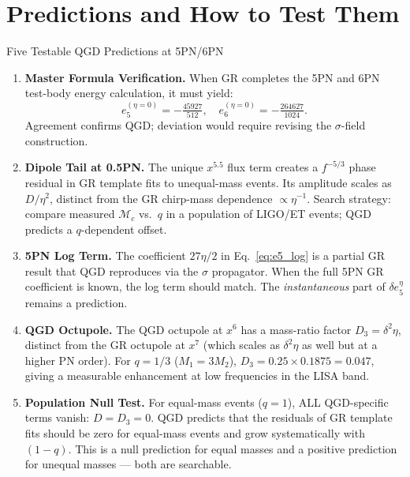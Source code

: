 \documentclass[11pt,a4paper]{article}
\theoremstyle{definition}
\theoremstyle{remark}
\begin{document}
	\section{Predictions and How to Test Them}
	\label{sec:predictions}
	
	Five Testable QGD Predictions at 5PN/6PN
		\begin{enumerate}
			
			\item[\textbf{M}] \textbf{Master Formula Verification.}
			When GR completes the 5PN and 6PN test-body energy calculation,
			it must yield:
			\[
			e_5^{(\eta=0)}=-\tfrac{45927}{512},
			\quad
			e_6^{(\eta=0)}=-\tfrac{264627}{1024}.
			\]
			Agreement confirms QGD; deviation would require revising the
			$\sigma$-field construction.
			
			\item[\textbf{T}] \textbf{Dipole Tail at 0.5PN.}
			The unique $x^{5.5}$ flux term creates a $f^{-5/3}$ phase residual
			in GR template fits to unequal-mass events.  Its amplitude scales
			as $D/\eta^2$, distinct from the GR chirp-mass dependence $\propto\eta^{-1}$.
			Search strategy: compare measured $\mathcal{M}_c$ vs.\ $q$ in a
			population of LIGO/ET events; QGD predicts a $q$-dependent offset.
			
			\item[\textbf{L}] \textbf{5PN Log Term.}
			The coefficient $27\eta/2$ in Eq.~\eqref{eq:e5_log} is a partial
			GR result that QGD reproduces via the $\sigma$ propagator.
			When the full 5PN GR coefficient is known, the log term should
			match.  The \emph{instantaneous} part of $\delta e_5^\eta$ remains
			a prediction.
			
			\item[\textbf{O}] \textbf{QGD Octupole.}
			The QGD octupole at $x^6$ has a mass-ratio factor $D_3=\delta^2\eta$,
			distinct from the GR octupole at $x^7$ (which scales as $\delta^2\eta$
			as well but at a higher PN order).  For $q=1/3$ ($M_1=3M_2$),
			$D_3=0.25\times0.1875=0.047$, giving a measurable enhancement at
			low frequencies in the LISA band.
			
			\item[\textbf{P}] \textbf{Population Null Test.}
			For equal-mass events ($q=1$), ALL QGD-specific terms vanish:
			$D=D_3=0$.  QGD predicts that the residuals of GR template fits
			should be zero for equal-mass events and grow systematically with
			$(1-q)$.  This is a null prediction for equal masses and a positive
			prediction for unequal masses — both are searchable.
			
		\end{enumerate}
\end{document}
